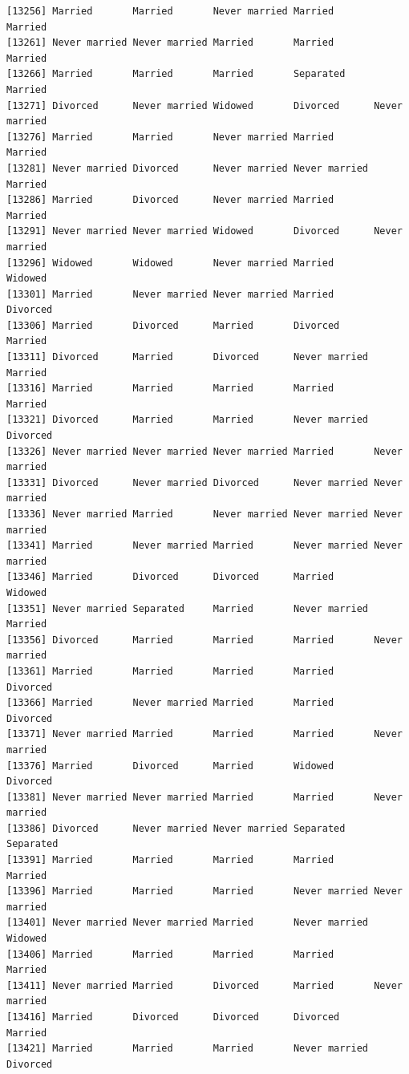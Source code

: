 \documentclass[
  letterpaper,
  DIV=11,
  numbers=noendperiod,
  oneside]{scrartcl}
\begin{document}
\begin{verbatim}
[13256] Married       Married       Never married Married       Married      
[13261] Never married Never married Married       Married       Married      
[13266] Married       Married       Married       Separated     Married      
[13271] Divorced      Never married Widowed       Divorced      Never married
[13276] Married       Married       Never married Married       Married      
[13281] Never married Divorced      Never married Never married Married      
[13286] Married       Divorced      Never married Married       Married      
[13291] Never married Never married Widowed       Divorced      Never married
[13296] Widowed       Widowed       Never married Married       Widowed      
[13301] Married       Never married Never married Married       Divorced     
[13306] Married       Divorced      Married       Divorced      Married      
[13311] Divorced      Married       Divorced      Never married Married      
[13316] Married       Married       Married       Married       Married      
[13321] Divorced      Married       Married       Never married Divorced     
[13326] Never married Never married Never married Married       Never married
[13331] Divorced      Never married Divorced      Never married Never married
[13336] Never married Married       Never married Never married Never married
[13341] Married       Never married Married       Never married Never married
[13346] Married       Divorced      Divorced      Married       Widowed      
[13351] Never married Separated     Married       Never married Married      
[13356] Divorced      Married       Married       Married       Never married
[13361] Married       Married       Married       Married       Divorced     
[13366] Married       Never married Married       Married       Divorced     
[13371] Never married Married       Married       Married       Never married
[13376] Married       Divorced      Married       Widowed       Divorced     
[13381] Never married Never married Married       Married       Never married
[13386] Divorced      Never married Never married Separated     Separated    
[13391] Married       Married       Married       Married       Married      
[13396] Married       Married       Married       Never married Never married
[13401] Never married Never married Married       Never married Widowed      
[13406] Married       Married       Married       Married       Married      
[13411] Never married Married       Divorced      Married       Never married
[13416] Married       Divorced      Divorced      Divorced      Married      
[13421] Married       Married       Married       Never married Divorced     

\end{verbatim}
\end{document}
